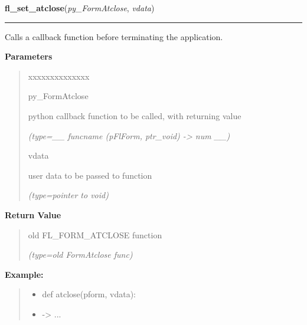\hspace{.8\funcindent}\begin{boxedminipage}{\funcwidth}

    \raggedright \textbf{fl\_set\_atclose}(\textit{py\_FormAtclose}, \textit{vdata})

    \vspace{-1.5ex}

    \rule{\textwidth}{0.5\fboxrule}
\setlength{\parskip}{2ex}
    Calls a callback function before terminating the application.

\setlength{\parskip}{1ex}
      \textbf{Parameters}
      \vspace{-1ex}

      \begin{quote}
        \begin{Ventry}{xxxxxxxxxxxxxx}

          \item[py\_FormAtclose]

          python callback function to be called, with returning value

            {\it (type=\_\_ funcname (pFlForm, ptr\_void) -{\textgreater} num \_\_)}

          \item[vdata]

          user data to be passed to function

            {\it (type=pointer to void)}

        \end{Ventry}

      \end{quote}

      \textbf{Return Value}
    \vspace{-1ex}

      \begin{quote}
      old FL\_FORM\_ATCLOSE function

      {\it (type=old FormAtclose func)}

      \end{quote}

\textbf{Example:}
\begin{quote}
  \begin{itemize}

  \item
    \setlength{\parskip}{0.6ex}
def atclose(pform, vdata):



  \item {\textbar}-{\textgreater}{\textbar} ...




\end{itemize}
\end{quote}
\end{boxedminipage}
